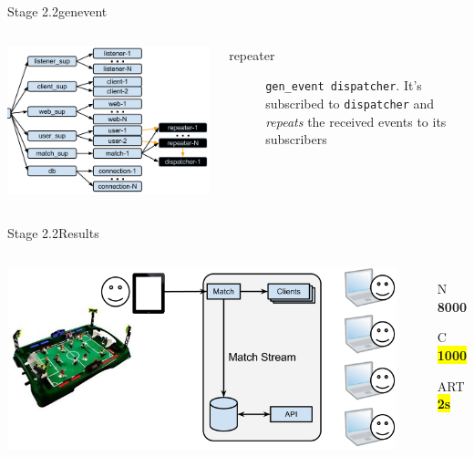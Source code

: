 \documentclass[utf8]{beamer}
\begin{document}
\begin{frame}{Stage 2.2}{gen\textunderscore event}
	\begin{columns}
			\begin{center}
				\includegraphics[height=.75\textheight]{img/architecture-3-2.png}
			\end{center}
			\begin{description}
				\item[repeater]
					\texttt{gen\_event dispatcher}. It's subscribed to \texttt{dispatcher} and \emph{repeats} the received events to its subscribers
			\end{description}
	\end{columns}
\end{frame}
\begin{frame}{Stage 2.2}{Results}
	\begin{columns}
		\column{.66\textwidth}
			\includegraphics[top=-1,width=\textwidth]{img/results-3-2.png}
		\column{.33\textwidth}
			\begin{itemize}
				\item[N] \textbf{\Large 8000}
				\item[C] \textbf{\colorbox{yellow}{\Large 1000}}
				\item[ART] \textbf{\colorbox{yellow}{\Large 2s}}
			\end{itemize}
	\end{columns}
\end{frame}
\end{document}
